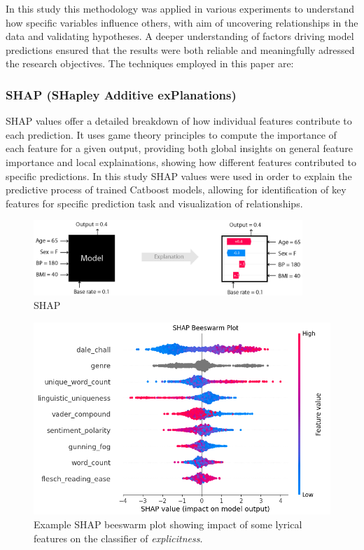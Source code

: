 In this study this methodology was applied in various experiments to understand
how specific variables influence others, with aim of uncovering relationships
in the data and validating hypotheses. A deeper  understanding of factors
driving model predictions ensured that the results were both reliable and
meaningfully adressed the research objectives. The  techniques employed in this paper are: 

\subsubsection*{SHAP (SHapley Additive exPlanations)}
SHAP values offer a detailed  breakdown of how individual features contribute
to  each prediction. It uses game theory principles to compute the importance
of each feature for a given output, providing both global insights on general
feature importance and  local explainations, showing how different features
contributed to specific predictions. In this study SHAP values were used in
order to explain the predictive process of trained Catboost models, allowing
for identification of key features for specific prediction task and
visualization of relationships.

\begin{center}
  \begin{figure}[H]
  \centering
  \includegraphics[width=4in]{img/shap_intro.png}
  \caption{SHAP\cite{shap}}
  \label{Figure:fig_beh}
\end{figure}
\end{center}

\begin{center}
  \begin{figure}[H]
  \centering
  \includegraphics[width=4.5in]{img/shap_beeswarm.png}
  \caption{Example SHAP beeswarm plot showing impact of some lyrical features
  on the classifier of \textit{explicitness}.}
  \label{Figure:fig_beh}
\end{figure}
\end{center}

